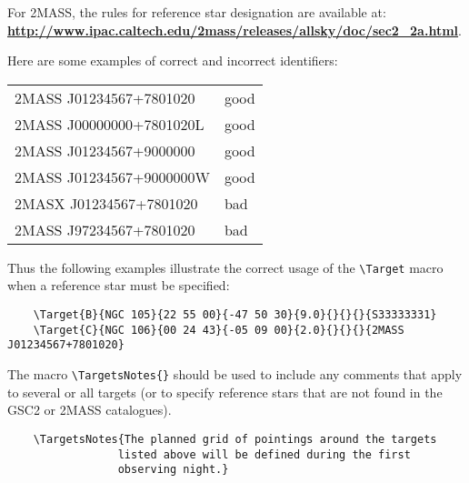 \documentclass{article}
\begin{document}

For 2MASS, the rules for reference star designation are available at:\\
\href{http://www.ipac.caltech.edu/2mass/releases/allsky/doc/sec2_2a.html}{\bf
\underline{http://www.ipac.caltech.edu/2mass/releases/allsky/doc/sec2\_2a.html}}. 

\smallskip

Here are some examples of correct and incorrect identifiers:

\begin{center}
\begin{tabular}{ll}
 2MASS J01234567+7801020      & good\\
 2MASS J00000000+7801020L     & good\\
 2MASS J01234567+9000000      & good\\
 2MASS J01234567+9000000W     & good\\
 2MASX J01234567+7801020      & bad\\
 2MASS J97234567+7801020      & bad\\
\end{tabular}
\end{center}

Thus the following examples illustrate the correct usage of the
\verb|\Target| macro when a reference star must be specified:
\begin{verbatim}
    \Target{B}{NGC 105}{22 55 00}{-47 50 30}{9.0}{}{}{}{S33333331}
    \Target{C}{NGC 106}{00 24 43}{-05 09 00}{2.0}{}{}{}{2MASS J01234567+7801020}
\end{verbatim}

The macro \verb|\TargetsNotes{}| should be used to include any
comments that apply to several or all targets (or to specify reference
stars that are not found in the GSC2 or 2MASS catalogues).
\begin{verbatim}
    \TargetsNotes{The planned grid of pointings around the targets 
                 listed above will be defined during the first 
                 observing night.}
\end{verbatim}
\end{document}
